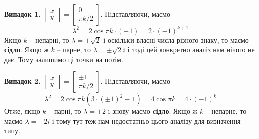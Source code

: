 \documentclass[14pt]{extarticle}
\begin{document}
\textbf{Випадок 1.} $\begin{bmatrix}
    x \\ y
\end{bmatrix} = \begin{bmatrix}
    0 \\ \pi k/2
\end{bmatrix}$. Підставляючи, маємо
\[
\lambda^2 = 2 \cos \pi k \cdot (-1) = 2 \cdot (-1)^{k+1}
\]
Якщо $k$ -- непарні, то $\lambda = \pm \sqrt{2}$ і оскільки власні числа різного знаку, то маємо \textbf{сідло}. Якщо ж $k$ -- парне, то $\lambda = \pm \sqrt{2}i$ і тоді цей конкретно аналіз нам нічого не дає. Тому залишимо ці точки на потім. 

\textbf{Випадок 2.} $\begin{bmatrix}
    x \\ y
\end{bmatrix} = \begin{bmatrix}
    \pm 1 \\ \pi k/2
\end{bmatrix}$. Підставляючи, маємо
\[
\lambda^2 = 2 \cos \pi k (3 \cdot (\pm 1)^2 - 1) = 4 \cos \pi k = 4 \cdot (-1)^k
\]
Отже, якщо $k$ -- парні, то $\lambda = \pm 2$ і знову маємо \textbf{cідло}. Якщо ж $k$ -- непарне, то маємо $\lambda = \pm 2i$ і тому тут теж нам недостатньо цього аналізу для визначення типу.
\end{document}
